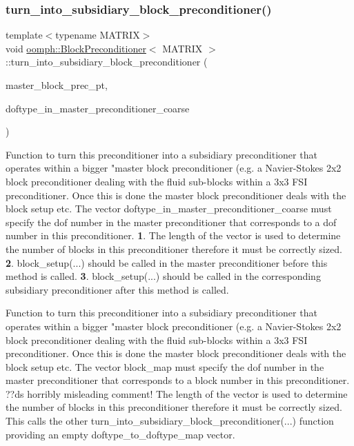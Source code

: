 \subsubsection{\texorpdfstring{turn\+\_\+into\+\_\+subsidiary\+\_\+block\+\_\+preconditioner()}{turn\_into\_subsidiary\_block\_preconditioner()}\hspace{0.1cm}{\footnotesize\ttfamily [1/2]}}
{\footnotesize\ttfamily template$<$typename M\+A\+T\+R\+IX$>$ \\
void \hyperlink{classoomph_1_1BlockPreconditioner}{oomph\+::\+Block\+Preconditioner}$<$ M\+A\+T\+R\+IX $>$\+::turn\+\_\+into\+\_\+subsidiary\+\_\+block\+\_\+preconditioner (\begin{DoxyParamCaption}\item[{\hyperlink{classoomph_1_1BlockPreconditioner}{Block\+Preconditioner}$<$ M\+A\+T\+R\+IX $>$ $\ast$}]{master\+\_\+block\+\_\+prec\+\_\+pt,  }\item[{const \hyperlink{classoomph_1_1Vector}{Vector}$<$ unsigned $>$ \&}]{doftype\+\_\+in\+\_\+master\+\_\+preconditioner\+\_\+coarse }\end{DoxyParamCaption})}



Function to turn this preconditioner into a subsidiary preconditioner that operates within a bigger "master block preconditioner (e.\+g. a Navier-\/\+Stokes 2x2 block preconditioner dealing with the fluid sub-\/blocks within a 3x3 F\+SI preconditioner. Once this is done the master block preconditioner deals with the block setup etc. The vector doftype\+\_\+in\+\_\+master\+\_\+preconditioner\+\_\+coarse must specify the dof number in the master preconditioner that corresponds to a dof number in this preconditioner. {\bfseries 1}. The length of the vector is used to determine the number of blocks in this preconditioner therefore it must be correctly sized. {\bfseries 2}. block\+\_\+setup(...) should be called in the master preconditioner before this method is called. {\bfseries 3}. block\+\_\+setup(...) should be called in the corresponding subsidiary preconditioner after this method is called. 

Function to turn this preconditioner into a subsidiary preconditioner that operates within a bigger "master block preconditioner (e.\+g. a Navier-\/\+Stokes 2x2 block preconditioner dealing with the fluid sub-\/blocks within a 3x3 F\+SI preconditioner. Once this is done the master block preconditioner deals with the block setup etc. The vector block\+\_\+map must specify the dof number in the master preconditioner that corresponds to a block number in this preconditioner. ??ds horribly misleading comment! The length of the vector is used to determine the number of blocks in this preconditioner therefore it must be correctly sized. This calls the other turn\+\_\+into\+\_\+subsidiary\+\_\+block\+\_\+preconditioner(...) function providing an empty doftype\+\_\+to\+\_\+doftype\+\_\+map vector.

